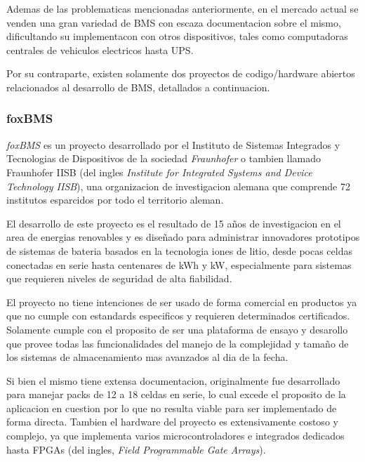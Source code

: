 \documentclass[10pt,a4paper]{article}
\begin{document}
    \noindent Ademas de las problematicas mencionadas anteriormente, en el 
    mercado actual se venden una gran variedad de BMS con escaza documentacion  
    sobre el mismo, dificultando su implementacon con otros dispositivos, tales
    como computadoras centrales de vehiculos electricos hasta UPS.

    \noindent Por su contraparte, existen solamente dos proyectos de 
    codigo/hardware abiertos relacionados al desarrollo de BMS, detallados a
    continuacion.

    \subsubsection{foxBMS}

    \emph{foxBMS} es un proyecto desarrollado por el Instituto de Sistemas 
    Integrados y Tecnologias de Dispositivos de la sociedad \emph{Fraunhofer} o 
    tambien llamado Fraunhofer IISB (del ingles \emph{Institute for Integrated 
    Systems and Device Technology IISB}), una organizacion de investigacion 
    alemana que comprende 72 institutos esparcidos por todo el territorio
    aleman.
    
    \noindent El desarrollo de este proyecto es el resultado de 15 años de 
    investigacion en el area de energias renovables y es diseñado para 
    administrar innovadores prototipos de sistemas de bateria basados en la 
    tecnologia iones de litio, desde pocas celdas conectadas en serie hasta 
    centenares de kWh y kW, especialmente para sistemas que requieren niveles 
    de seguridad de alta fiabilidad.
    
    \noindent El proyecto no tiene intenciones de ser usado de forma comercial 
    en productos ya que no cumple con estandards especificos y requieren
    determinados certificados. Solamente cumple con el proposito de ser una
    plataforma de ensayo y desarollo que provee todas las funcionalidades del
    manejo de la complejidad y tamaño de los sistemas de almacenamiento mas
    avanzados al dia de la fecha.
    
    \noindent Si bien el mismo tiene extensa documentacion, originalmente fue
    desarrollado para manejar packs de 12 a 18 celdas en serie, lo cual excede
    el proposito de la aplicacion en cuestion por lo que no resulta viable para
    ser implementado de forma directa. Tambien el hardware del proyecto es
    extensivamente costoso y complejo, ya que implementa varios 
    microcontroladores e integrados dedicados hasta FPGAs 
    (del ingles, \emph{Field Programmable Gate Arrays}).
\end{document}
